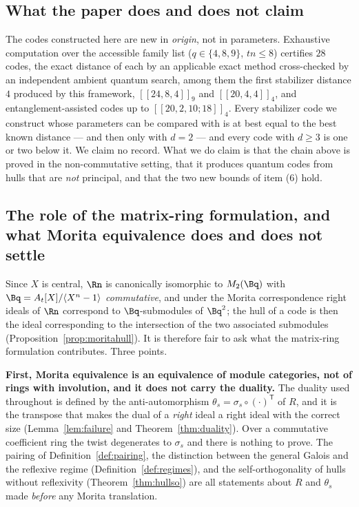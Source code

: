 \subsection{What the paper does and does not claim}

The codes constructed here are new in \emph{origin}, not in parameters.
Exhaustive computation over the accessible family list ($q\in\{4,8,9\}$,
$tn\le8$) certifies $28$ codes, the exact distance of each by an applicable
exact method cross-checked by an independent ambient quantum search, among them the
first stabilizer distance $4$ produced by this framework, $[[24,8,4]]_9$ and
$[[20,4,4]]_4$, and entanglement-assisted codes up to $[[20,2,10;18]]_4$. Every
stabilizer code we construct whose parameters can be compared with
\cite{GrasslCodetables} is at best equal to the best known distance --- and then
only with $d=2$ --- and every code with $d\ge3$ is one or two below it. We claim
no record. What we do claim is that the chain above is proved in the
non-commutative setting, that it produces quantum codes from hulls that are
\emph{not} principal, and that the two new bounds of item (6) hold.

\subsection{The role of the matrix-ring formulation, and what Morita
            equivalence does and does not settle}
\label{subsec:morita}

Since $X$ is central, $\Rn$ is canonically isomorphic to $M_2(\Bq)$ with
$\Bq=A_t[X]/\langle X^n-1\rangle$ \emph{commutative}, and under the Morita
correspondence right ideals of $\Rn$ correspond to $\Bq$-submodules of
$\Bq^2$; the hull of a code is then the ideal corresponding to the
intersection of the two associated submodules
(Proposition~\ref{prop:moritahull}). It is therefore fair to ask what the
matrix-ring formulation contributes. Three points.

\textbf{First, Morita equivalence is an equivalence of module categories, not
of rings with involution, and it does not carry the duality.} The duality used
throughout is defined by the anti-automorphism
$\theta_s=\sigma_s\circ(\cdot)^{\mathsf T}$ of $R$, and it is the transpose
that makes the dual of a \emph{right} ideal a right ideal with the correct
size (Lemma~\ref{lem:failure} and Theorem~\ref{thm:duality}). Over a
commutative coefficient ring the twist degenerates to $\sigma_s$ and there is
nothing to prove. The pairing of Definition~\ref{def:pairing}, the distinction
between the general Galois and the reflexive regime
(Definition~\ref{def:regimes}), and the self-orthogonality of hulls without
reflexivity (Theorem~\ref{thm:hullso}) are all statements about $R$ and
$\theta_s$ made \emph{before} any Morita translation.

